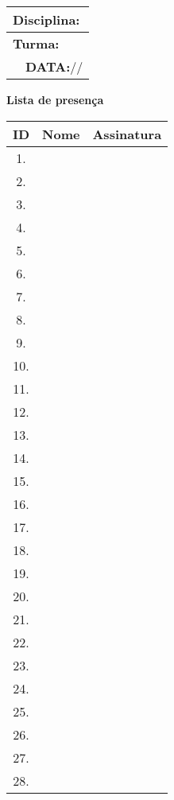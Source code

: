 \documentclass[a4paper,11pt,twoside]{report}
\begin{document}
\pagestyle{empty}
\noindent
\begin{tabularx}{\textwidth}{X c}
\hline
\multicolumn{2}{|l|}{\textbf{Disciplina: }}\\
\hline
\multicolumn{2}{|l|}{\textbf{Turma: }}\\
\hline
& \multicolumn{1}{|r|}{\rule{0pt}{25pt}\textbf{DATA:}\quad\underline{\hspace{0.8cm}}/\underline{\hspace{0.8cm}}/\underline{\hspace{1.2cm}} }\\
\cline{2-2}
\end{tabularx}

\begin{center}
    \textbf{Lista de presença}
\end{center}

\noindent
\begin{tabularx}{\textwidth}{|c| c |X|}
\hline
\textbf{ID} & \textbf{Nome} & \multicolumn{1}{c|}{\textbf{Assinatura}}\\
\hline
1. & \hspace{6cm} &\\
\hline
2. &  &\\
\hline
3. &  &\\
\hline
4. &  &\\
\hline
5. &  &\\
\hline
6. &  &\\
\hline
7. &  &\\
\hline
8. &  &\\
\hline
9. &  &\\
\hline
10. &  &\\
\hline
11. &  &\\
\hline
12. &  &\\
\hline
13. &  &\\
\hline
14. &  &\\
\hline
15. &  &\\
\hline
16. &  &\\
\hline
17. &  &\\
\hline
18. &  &\\
\hline
19. &  &\\
\hline
20. &  &\\
\hline
21. &  &\\
\hline
22. &  &\\
\hline
23. &  &\\
\hline
24. &  &\\
\hline
25. &  &\\
\hline
26. &  &\\
\hline
27. &  &\\
\hline
28. &  &\\
\hline


\end{tabularx}


\end{document}
